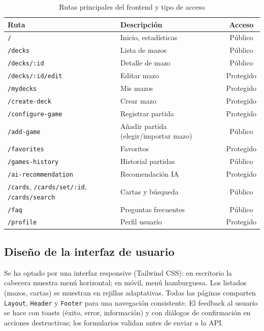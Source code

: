 \begin{table}[H]
    \centering
    \small
    \begin{tabular}{|l|l|c|}
        \hline
        \textbf{Ruta} & \textbf{Descripción} & \textbf{Acceso} \\
        \hline
        \texttt{/} & Inicio, estadísticas & Público \\
        \texttt{/decks} & Lista de mazos & Público \\
        \texttt{/decks/:id} & Detalle de mazo & Público \\
        \texttt{/decks/:id/edit} & Editar mazo & Protegido \\
        \texttt{/mydecks} & Mis mazos & Protegido \\
        \texttt{/create-deck} & Crear mazo & Protegido \\
        \texttt{/configure-game} & Registrar partida & Protegido \\
        \texttt{/add-game} & Añadir partida (elegir/importar mazo) & Público \\
        \texttt{/favorites} & Favoritos & Protegido \\
        \texttt{/games-history} & Historial partidas & Público \\
        \texttt{/ai-recommendation} & Recomendación IA & Protegido \\
        \texttt{/cards}, \texttt{/cards/set/:id}, \texttt{/cards/search} & Cartas y búsqueda & Público \\
        \texttt{/faq} & Preguntas frecuentes & Público \\
        \texttt{/profile} & Perfil usuario & Protegido \\
        \hline
    \end{tabular}
    \caption{Rutas principales del frontend y tipo de acceso}
    \label{tab:rutas}
\end{table}

\subsection{Diseño de la interfaz de usuario}

Se ha optado por una interfaz responsive (Tailwind CSS): en escritorio la cabecera muestra menú horizontal; en móvil, menú hamburguesa. Los listados (mazos, cartas) se muestran en rejillas adaptativas. Todas las páginas comparten \texttt{Layout}, \texttt{Header} y \texttt{Footer} para una navegación consistente. El feedback al usuario se hace con toasts (éxito, error, información) y con diálogos de confirmación en acciones destructivas; los formularios validan antes de enviar a la API.

